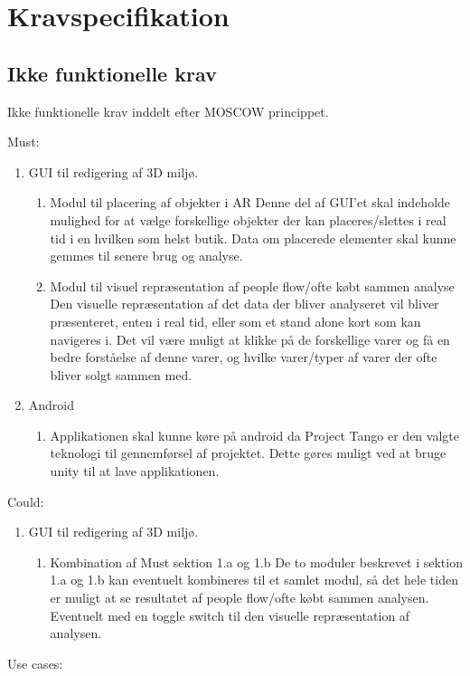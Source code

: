 \chapter{Kravspecifikation}

\section{Ikke funktionelle krav}
Ikke funktionelle krav inddelt efter MOSCOW princippet.

Must:
\begin{enumerate}
   \item GUI til redigering af 3D miljø.
   \begin{enumerate}
     \item Modul til placering af objekter i AR
            Denne del af GUI’et skal indeholde mulighed for at vælge forskellige objekter der kan placeres/slettes i real tid i en hvilken som helst butik. Data om placerede elementer skal kunne gemmes til senere brug og analyse. 
     \item Modul til visuel repræsentation af people flow/ofte købt sammen analyse
            Den visuelle repræsentation af det data der bliver analyseret vil bliver præsenteret, enten i real tid, eller som et stand alone kort som kan navigeres i. Det vil være muligt at klikke på de forskellige varer og få en bedre forståelse af denne varer, og hvilke varer/typer af varer der ofte bliver solgt sammen med.
   \end{enumerate}
   \item Android
   \begin{enumerate}
      \item Applikationen skal kunne køre på android da Project Tango er den valgte       teknologi til gennemførsel af projektet. Dette gøres muligt ved at bruge unity til at lave applikationen.
   \end{enumerate}
\end{enumerate}

Could:

\begin{enumerate}
   \item GUI til redigering af 3D miljø.
   \begin{enumerate}
     \item Kombination af Must sektion 1.a og 1.b
De to moduler beskrevet i sektion 1.a og 1.b kan eventuelt kombineres til et samlet modul, så det hele tiden er muligt at se resultatet af people flow/ofte købt sammen analysen. Eventuelt med en toggle switch til den visuelle repræsentation af analysen.
   \end{enumerate}
\end{enumerate}


Use cases:

